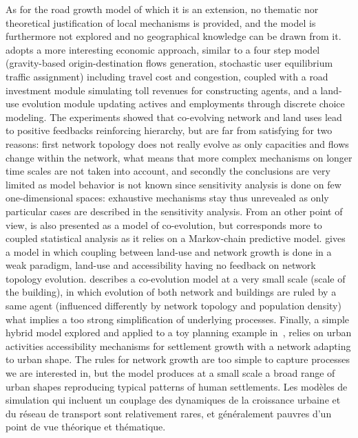 {As for the road growth model of which it is an extension, no thematic nor theoretical justification of local mechanisms is provided, and the model is furthermore not explored and no geographical knowledge can be drawn from it. \cite{levinson2007co} adopts a more interesting economic approach, similar to a four step model (gravity-based origin-destination flows generation, stochastic user equilibrium traffic assignment) including travel cost and congestion, coupled with a road investment module simulating toll revenues for constructing agents, and a land-use evolution module updating actives and employments through discrete choice modeling. The experiments showed that co-evolving network and land uses lead to positive feedbacks reinforcing hierarchy, but are far from satisfying for two reasons: first network topology does not really evolve as only capacities and flows change within the network, what means that more complex mechanisms on longer time scales are not taken into account, and secondly the conclusions are very limited as model behavior is not known since sensitivity analysis is done on few one-dimensional spaces: exhaustive mechanisms stay thus unrevealed as only particular cases are described in the sensitivity analysis. From an other point of view, \cite{levinson2005paving} is also presented as a model of co-evolution, but corresponds more to coupled statistical analysis as it relies on a Markov-chain predictive model. \cite{rui2011urban} gives a model in which coupling between land-use and network growth is done in a weak paradigm, land-use and accessibility having no feedback on network topology evolution. \cite{achibet2014model} describes a co-evolution model at a very small scale (scale of the building), in which evolution of both network and buildings are ruled by a same agent (influenced differently by network topology and population density) what implies a too strong simplification of underlying processes. Finally, a simple hybrid model explored and applied to a toy planning example in~\cite{raimbault2014hybrid}, relies on urban activities accessibility mechanisms for settlement growth with a network adapting to urban shape. The rules for network growth are too simple to capture processes we are interested in, but the model produces at a small scale a broad range of urban shapes reproducing typical patterns of human settlements.
}{
Les modèles de simulation qui incluent un couplage des dynamiques de la croissance urbaine et du réseau de transport sont relativement rares, et généralement pauvres d'un point de vue théorique et thématique. 
}
